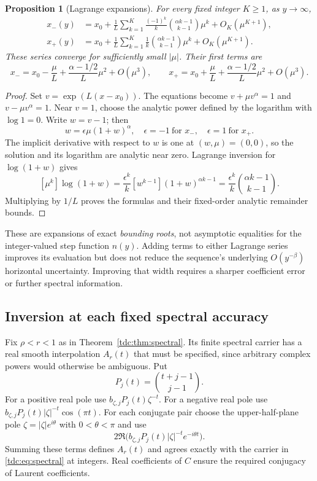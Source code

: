 \documentclass[11pt]{article}
\newtheorem{proposition}[theorem]{Proposition}
\theoremstyle{definition}\newtheorem{definition}[theorem]{Definition}
\theoremstyle{remark}\newtheorem{remark}[theorem]{Remark}
\begin{document}
\begin{proposition}[Lagrange expansions]\label{tdc:prop:lagrange}
For every fixed integer $K\ge1$, as $y\to\infty$,
\begin{align}
 x_-(y)&=x_0+\frac1L\sum_{k=1}^K
 \frac{(-1)^k}{k}\binom{\alpha k-1}{k-1}\mu^k
 +O_K(\mu^{K+1}),\label{tdc:eq:minusseries}\\
 x_+(y)&=x_0+\frac1L\sum_{k=1}^K
 \frac1k\binom{\alpha k-1}{k-1}\mu^k
 +O_K(\mu^{K+1}).\label{tdc:eq:plusseries}
\end{align}
These series converge for sufficiently small $|\mu|$. Their first terms are
\[
 x_-=x_0-\frac\mu L+\frac{\alpha-1/2}{L}\mu^2+O(\mu^3),\qquad
 x_+=x_0+\frac\mu L+\frac{\alpha-1/2}{L}\mu^2+O(\mu^3).
\]
\end{proposition}
\begin{proof}
Set $v=\exp(L(x-x_0))$. The equations become $v+\mu v^\alpha=1$ and $v-\mu v^\alpha=1$. Near $v=1$, choose the analytic power defined by the logarithm with $\log1=0$. Write $w=v-1$; then
\[
 w=\epsilon\mu(1+w)^\alpha,
 \quad\epsilon=-1\ \text{for }x_-,\quad\epsilon=1\ \text{for }x_+.
\]
The implicit derivative with respect to $w$ is one at $(w,\mu)=(0,0)$, so the solution and its logarithm are analytic near zero. Lagrange inversion for $\log(1+w)$ gives
\[
 [\mu^k]\log(1+w)=\frac{\epsilon^k}{k}
 [w^{k-1}](1+w)^{\alpha k-1}
 =\frac{\epsilon^k}{k}\binom{\alpha k-1}{k-1}.
\]
Multiplying by $1/L$ proves the formulas and their fixed-order analytic remainder bounds.
\end{proof}

These are expansions of exact \emph{bounding roots}, not asymptotic equalities for the integer-valued step function $n(y)$. Adding terms to either Lagrange series improves its evaluation but does not reduce the sequence's underlying $O(y^{-\beta})$ horizontal uncertainty. Improving that width requires a sharper coefficient error or further spectral information.

\subsection{Inversion at each fixed spectral accuracy}
Fix $\rho<r<1$ as in Theorem~\ref{tdc:thm:spectral}. Its finite spectral carrier has a real smooth interpolation $A_r(t)$ that must be specified, since arbitrary complex powers would otherwise be ambiguous. Put
\[
 P_j(t)=\binom{t+j-1}{j-1}.
\]
For a positive real pole use $b_{\zeta,j}P_j(t)\zeta^{-t}$. For a negative real pole use
$b_{\zeta,j}P_j(t)|\zeta|^{-t}\cos(\pi t)$. For each conjugate pair choose the upper-half-plane pole $\zeta=|\zeta|e^{i\theta}$ with $0<\theta<\pi$ and use
\[
 2\Re\bigl(b_{\zeta,j}P_j(t)|\zeta|^{-t}e^{-i\theta t}\bigr).
\]
Summing these terms defines $A_r(t)$ and agrees exactly with the carrier in \eqref{tdc:eq:spectral} at integers. Real coefficients of $C$ ensure the required conjugacy of Laurent coefficients.
\end{document}

